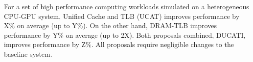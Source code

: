 \noindent For a set of high performance computing workloads simulated
on a heterogeneous CPU-GPU system, Unified Cache and TLB (UCAT)
improves performance by X\% on average (up to Y\%). On the other hand,
DRAM-TLB improves performance by Y\% on average (up to 2X). Both
proposals combined, DUCATI, improves performance by Z\%. All proposals
require negligible changes to the baseline system.











